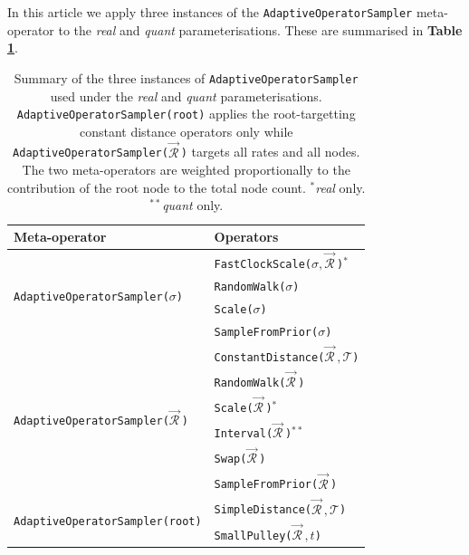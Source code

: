 \documentclass[10pt,letterpaper]{article}
\begin{document}
In this article we apply three instances of the \texttt{AdaptiveOperatorSampler} meta-operator to the \textit{real} and \textit{quant} parameterisations. 
These are summarised in \textbf{Table \ref{table:adaptiveSampling}}.



\begin{table}[h!]
\centering
\begin{tabular}{|l p{4cm}|} 
 \hline
 Meta-operator & Operators \\
\hline
 \multirow{4}{*}{\texttt{AdaptiveOperatorSampler($\sigma$)}} & \texttt{FastClockScale($\sigma, \vec{\mathcal{R}}^{\,}$)}$^{*}$ \\ 
 & \texttt{RandomWalk($\sigma$)} \\
 & \texttt{Scale($\sigma$)} \\
 & \texttt{SampleFromPrior($\sigma$)} \\
 \hline
  \multirow{6}{*}{\texttt{AdaptiveOperatorSampler($\vec{\mathcal{R}}^{\,}$)}} & \texttt{ConstantDistance($\vec{\mathcal{R}}^{\,}, \mathcal{T}$)} \\ 
& \texttt{RandomWalk($\vec{\mathcal{R}}^{\,}$)} \\
& \texttt{Scale($\vec{\mathcal{R}}^{\,}$)}$^{*}$ \\
& \texttt{Interval($\vec{\mathcal{R}}^{\,}$)}$^{**}$  \\
& \texttt{Swap($\vec{\mathcal{R}}^{\,}$)} \\
& \texttt{SampleFromPrior($\vec{\mathcal{R}}^{\,}$)} \\
 \hline
   \multirow{2}{*}{\texttt{AdaptiveOperatorSampler(root)}} & \texttt{SimpleDistance($\vec{\mathcal{R}}^{\,}, \mathcal{T}$)} \\ 
&  \texttt{SmallPulley($\vec{\mathcal{R}}^{\,}, t$)}\\
 \hline
\end{tabular}
\caption{Summary of the three instances of \texttt{AdaptiveOperatorSampler} used under the \textit{real} and \textit{quant} parameterisations.
\texttt{AdaptiveOperatorSampler(root)} applies the root-targetting constant distance operators only \cite{zhang2020improving} while \texttt{AdaptiveOperatorSampler($\vec{\mathcal{R}}^{\,}$)} targets all rates and all nodes. 
The two meta-operators are weighted proportionally to the contribution of the root node to the total node count. 
  $^{*}$\textit{real} only. $^{**}$\textit{quant} only. }
\label{table:adaptiveSampling}
\end{table}
\end{document}

